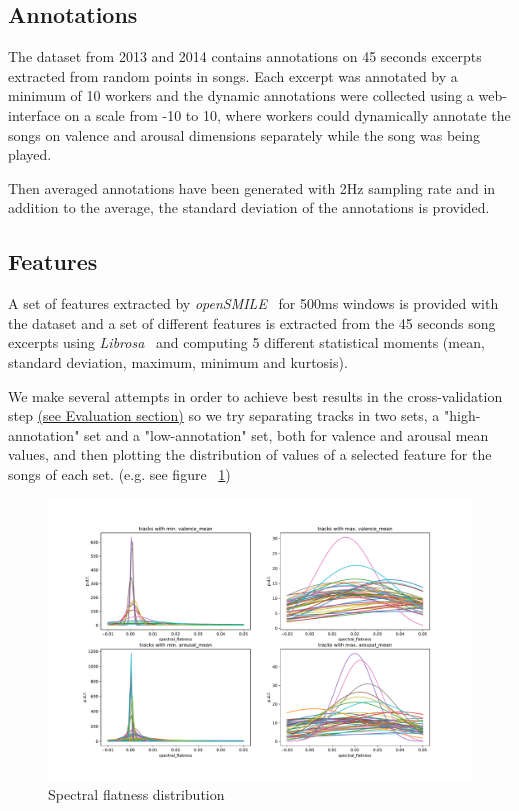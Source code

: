 \subsection{Annotations}

The dataset from 2013 and 2014 contains annotations on 45 seconds excerpts extracted from random points in songs. Each excerpt was annotated by a minimum of 10 workers and the dynamic annotations were collected using a web-interface on a scale from -10 to 10, where workers could dynamically annotate the songs on valence and arousal dimensions separately while the song was being played.~\cite{aljanaki2017developing}

Then averaged annotations have been generated with 2Hz sampling rate and in addition to the average, the standard deviation of the annotations is provided.~\cite{soleymani2016deam}


\subsection{Features}

A set of features extracted by \emph{openSMILE}~\cite{opensmile} for 500ms windows is provided with the dataset and a set of different features is extracted from the 45 seconds song excerpts using \emph{Librosa}~\cite{librosa} and computing 5 different statistical moments (mean, standard deviation, maximum, minimum and kurtosis).

We make several attempts in order to achieve best results in the cross-validation step \hyperref[sec:evaluation]{(see Evaluation section)} so we try separating tracks in two sets, a "high-annotation" set and a "low-annotation" set, both for valence and arousal mean values, and then plotting the distribution of values of a selected feature for the songs of each set. (e.g. see figure ~\ref{fig:va_mean-spectral_flatness-dists})

\begin{figure}
	\centering
	\includegraphics[width=0.9\linewidth]{assets/va_mean-spectral_flatness-dists.pdf}
	\caption{Spectral flatness distribution}
	\label{fig:va_mean-spectral_flatness-dists}
\end{figure}

